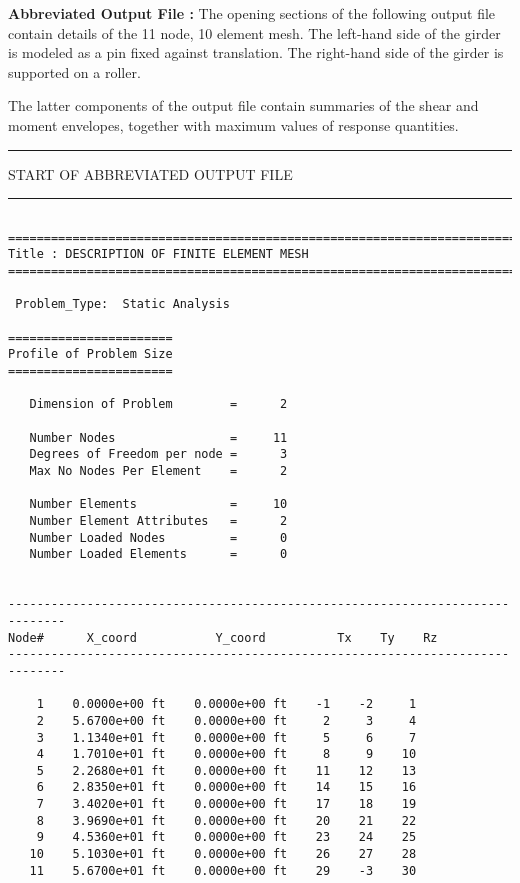 \vspace{0.15 in}\noindent
{\bf Abbreviated Output File :}
The opening sections of the following output file 
contain details of the 11 node, 10 element mesh.
The left-hand side of the girder is modeled as a pin fixed against translation.
The right-hand side of the girder is supported on a roller.

\vspace{0.15 in}
\noindent\hspace{0.51 in}
The latter components of the output file contain summaries
of the shear and moment envelopes,
together with maximum values of response quantities.

\vspace{0.20 truein}
\begin{footnotesize}
\noindent
{\rule{1.7 in}{0.035 in} START OF ABBREVIATED OUTPUT FILE \rule{1.7 in}{0.035 in} }
\begin{verbatim}

===========================================================================
Title : DESCRIPTION OF FINITE ELEMENT MESH                                 
===========================================================================

 Problem_Type:  Static Analysis

=======================
Profile of Problem Size
=======================

   Dimension of Problem        =      2

   Number Nodes                =     11
   Degrees of Freedom per node =      3
   Max No Nodes Per Element    =      2

   Number Elements             =     10
   Number Element Attributes   =      2
   Number Loaded Nodes         =      0
   Number Loaded Elements      =      0


------------------------------------------------------------------------------
Node#      X_coord           Y_coord          Tx    Ty    Rz  
------------------------------------------------------------------------------

    1    0.0000e+00 ft    0.0000e+00 ft    -1    -2     1 
    2    5.6700e+00 ft    0.0000e+00 ft     2     3     4 
    3    1.1340e+01 ft    0.0000e+00 ft     5     6     7 
    4    1.7010e+01 ft    0.0000e+00 ft     8     9    10 
    5    2.2680e+01 ft    0.0000e+00 ft    11    12    13 
    6    2.8350e+01 ft    0.0000e+00 ft    14    15    16 
    7    3.4020e+01 ft    0.0000e+00 ft    17    18    19 
    8    3.9690e+01 ft    0.0000e+00 ft    20    21    22 
    9    4.5360e+01 ft    0.0000e+00 ft    23    24    25 
   10    5.1030e+01 ft    0.0000e+00 ft    26    27    28 
   11    5.6700e+01 ft    0.0000e+00 ft    29    -3    30 



\end{verbatim}
\end{footnotesize}

